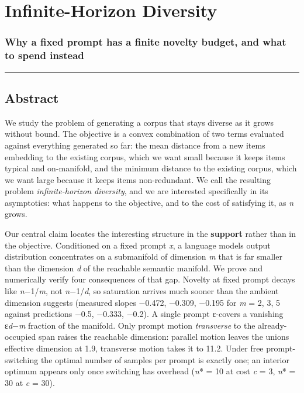 \documentclass[
  11pt,
]{article}
\author{}
\date{}
\theoremstyle{plain}
\theoremstyle{definition}
\begin{document}
{
\hypersetup{linkcolor=}
\setcounter{tocdepth}{2}
\tableofcontents
}
\section{Infinite-Horizon Diversity}\label{infinite-horizon-diversity}

\subsubsection{Why a fixed prompt has a finite novelty budget, and what
to spend
instead}\label{why-a-fixed-prompt-has-a-finite-novelty-budget-and-what-to-spend-instead}

\begin{center}\rule{0.5\linewidth}{0.5pt}\end{center}

\subsection{Abstract}\label{abstract}

We study the problem of generating a corpus that stays diverse as it
grows without bound. The objective is a convex combination of two terms
evaluated against everything generated so far: the mean distance from a
new item\textquotesingle s embedding to the existing corpus, which we
want small because it keeps items typical and on-manifold, and the
minimum distance to the existing corpus, which we want large because it
keeps items non-redundant. We call the resulting problem
\emph{infinite-horizon diversity}, and we are interested specifically in
its asymptotics: what happens to the objective, and to the cost of
satisfying it, as \emph{n} grows.

Our central claim locates the interesting structure in the
\textbf{support} rather than in the objective. Conditioned on a fixed
prompt \emph{x}, a language model\textquotesingle s output distribution
concentrates on a submanifold of dimension \emph{m} that is far smaller
than the dimension \emph{d} of the reachable semantic manifold. We prove
and numerically verify four consequences of that gap. Novelty at fixed
prompt decays like \emph{n}−1/\emph{m}, not \emph{n}−1/\emph{d}, so
saturation arrives much sooner than the ambient dimension suggests
(measured slopes −0.472, −0.309, −0.195 for \emph{m} = 2, 3, 5 against
predictions −0.5, −0.333, −0.2). A single prompt ε-covers a vanishing
ε\emph{d}−\emph{m} fraction of the manifold. Only prompt motion
\emph{transverse} to the already-occupied span raises the reachable
dimension: parallel motion leaves the union\textquotesingle s effective
dimension at 1.9, transverse motion takes it to 11.2. Under free
prompt-switching the optimal number of samples per prompt is exactly
one; an interior optimum appears only once switching has overhead
(\emph{n}* = 10 at cost \emph{c} = 3, \emph{n}* = 30 at \emph{c} = 30).
\end{document}
